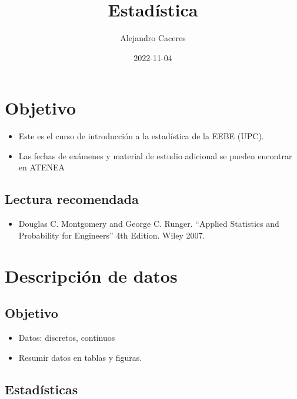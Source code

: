 \documentclass[
]{book}
\title{Estadística}
\author{Alejandro Caceres}
\date{2022-11-04}
\providecommand{\tightlist}{%
  \setlength{\itemsep}{0pt}\setlength{\parskip}{0pt}}
\begin{document}
\maketitle

{
\setcounter{tocdepth}{1}
\tableofcontents
}
\hypertarget{objetivo}{%
\chapter{Objetivo}\label{objetivo}}

\begin{itemize}
\item
  Este es el curso de introducción a la estadística de la EEBE (UPC).
\item
  Las fechas de exámenes y material de estudio adicional se pueden encontrar en ATENEA
\end{itemize}

\hypertarget{lectura-recomendada}{%
\section{Lectura recomendada}\label{lectura-recomendada}}

\begin{itemize}
\tightlist
\item
  Douglas C. Montgomery and George C. Runger. ``Applied Statistics and Probability for Engineers'' 4th Edition. Wiley 2007.
\end{itemize}

\hypertarget{descripciuxf3n-de-datos}{%
\chapter{Descripción de datos}\label{descripciuxf3n-de-datos}}

\hypertarget{objetivo-1}{%
\section{Objetivo}\label{objetivo-1}}

\begin{itemize}
\tightlist
\item
  Datos: discretos, continuos
\item
  Resumir datos en tablas y figuras.
\end{itemize}

\hypertarget{estaduxedsticas}{%
\section{Estadísticas}\label{estaduxedsticas}}
\end{document}

